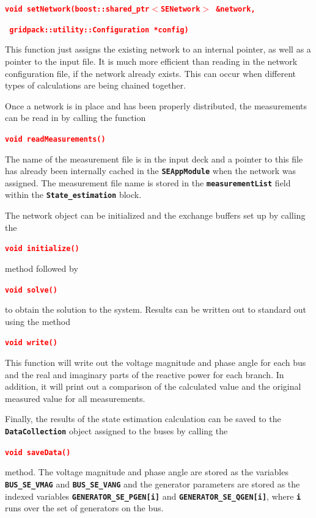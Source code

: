 \documentclass[12pt]{report} %
\begin{document}
\textcolor{red}{\texttt{\textbf{void setNetwork(boost::shared\_ptr$\boldsymbol{\mathrm{<}}$SENetwork$\boldsymbol{\mathrm{>}}$ \&network,}}}

\textcolor{red}{\texttt{\textbf{    gridpack::utility::Configuration *config)}}}

This function just assigns the existing network to an internal pointer, as well as a pointer to the input file. It is much more efficient than reading in the network configuration file, if the network already exists. This can occur when different types of calculations are being chained together.

Once a network is in place and has been properly distributed, the measurements can be read in by calling the function

\textcolor{red}{\texttt{\textbf{void readMeasurements()}}}

The name of the measurement file is in the input deck and a pointer to this file has already been internally cached in the \texttt{\textbf{SEAppModule}} when the network was assigned. The measurement file name is stored in the \texttt{\textbf{measurementList}} field within the \texttt{\textbf{State\_estimation}} block.

The network object can be initialized and the exchange buffers set up by calling the

\textcolor{red}{\texttt{\textbf{void initialize()}}}

method followed by

\textcolor{red}{\texttt{\textbf{void solve()}}}

to obtain the solution to the system. Results can be written out to standard out using the method

\textcolor{red}{\texttt{\textbf{void write()}}}

This function will write out the voltage magnitude and phase angle for each bus and the real and imaginary parts of the reactive power for each branch. In addition, it will print out a comparison of the calculated value and the original measured value for all measurements.

Finally, the results of the state estimation calculation can be saved to the \texttt{\textbf{DataCollection}} object assigned to the buses by calling the 

\textcolor{red}{\texttt{\textbf{void saveData()}}}

method. The voltage magnitude and phase angle are stored as the variables \texttt{\textbf{BUS\_SE\_VMAG}} and \texttt{\textbf{BUS\_SE\_VANG}} and the generator parameters are stored as the indexed variables \texttt{\textbf{GENERATOR\_SE\_PGEN[i]}} and \texttt{\textbf{GENERATOR\_SE\_QGEN[i]}}, where \texttt{\textbf{i}} runs over the set of generators on the bus.
\end{document}
